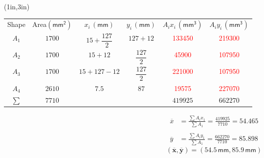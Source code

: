 \documentclass[10pt,oneside]{article}
\begin{document}
\begin{textblock*}{6.5in}(1in,3in)
	\centering	
	\Large\parb\vspace{1cm}\centering
	\begin{tabular}{cccccc}
			Shape  & Area$ (\mathsf{mm^2})$  & $x_i\,\mathsf{(mm)}$ & $y_i\,\mathsf{(mm)}$ & $A_ix_i\,\mathsf{(mm^3)}$ & $A_iy_i\,\mathsf{ (mm^3)}$   \\
			\addlinespace
			\toprule\addlinespace
			$A_1$  & $1700$   & $15+\dfrac{127}{2}$  & $127+12$ & \textcolor{red}{133450} & \textcolor{red}{219300}  \\
			\addlinespace\midrule\addlinespace
			$A_2$  & $1700$ & $15+12$  & $\dfrac{127}{2}$ & \textcolor{red}{45900} & \textcolor{red}{107950}  \\
			\addlinespace\midrule\addlinespace
			$A_3$  & $1700$  & $15+127-12$ &  $\dfrac{127}{2}$  & \textcolor{red}{221000} & \textcolor{red}{107950}  \\
			\addlinespace\midrule\addlinespace
			$A_4$  & $2610$  & $7.5$ & $87$  & \textcolor{red}{19575} & \textcolor{red}{227070}  \\
			
			\addlinespace\bottomrule\addlinespace
			{$\sum$} & \textcolor{saitRed}{$7710$} &  & & \textcolor{saitRed}{$419925$} & \textcolor{saitRed}{$662270$}
		\end{tabular}
		\parb
		\begin{align*}
			\overline{x} &= \frac{\sum A_ix_1}{\sum A_1}=\frac{419925}{7710} = 54.465 \\\\
			\overline{y} &= \frac{\sum A_iy_1}{\sum A_1}=\frac{662270}{7710} = 85.898
		\end{align*}
		\parb
		$$ \bm{(\overline{x}, \overline{y}) = (54.5\,\mathsf{mm}, 85.9\,\mathsf{mm})} $$
\end{textblock*}
\end{document}
